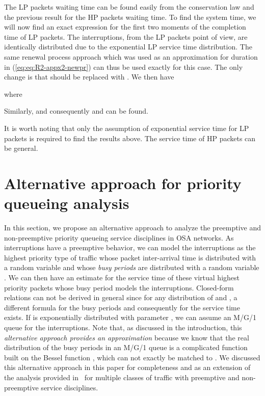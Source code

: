 \documentclass[11pt,journal,oneside,onecolumn,draftclsnofoot]{IEEEtran}
\begin{document}
The LP packets waiting time can be found easily from the conservation law and the previous result for the HP packets waiting time. To find the system time, we will now find an exact expression for the first two moments of the completion time of LP packets. The interruptions, from the LP packets point of view, are identically distributed due to the exponential LP service time distribution.
The same renewal process approach which was used as an approximation for  duration in (\ref{eq:eq:R2-appx2-newpr}) can thus be used exactly for this case. The only change is that  should be replaced with .
We then have 

where 

Similarly,  and consequently  and  can be found.

It is worth noting that only the assumption of exponential service time for LP packets is required to find the results above. The service time of HP packets can be general. 

\section{Alternative approach for priority queueing analysis}
\label{app:alt_approach}
In this section, we propose an alternative approach to analyze the preemptive and non-preemptive priority queueing service disciplines in OSA networks. As interruptions have a preemptive behavior, we can model the interruptions as the highest priority type of traffic whose packet inter-arrival time is distributed with a random variable  and whose \emph{busy periods} are distributed with a random variable . We can then have an estimate for the service time of these virtual highest priority packets whose  busy period models the interruptions. Closed-form relations can not be derived in general since for any distribution of  and , a different formula for the busy periods and consequently for the service time exists. If  is exponentially distributed with parameter , we can assume an  M/G/1 queue for the interruptions.  
Note that, as discussed in the introduction, this \emph{alternative approach provides an approximation} because we know that the real distribution of the busy periods in an M/G/1 queue is a complicated function built on the Bessel function \cite{takagi91}, which can not exactly be matched to . We discussed this alternative approach in this paper for completeness and as an extension of the analysis provided in~\cite{wang-l11,rashid07,laourine10} for multiple classes of traffic with preemptive and non-preemptive service disciplines.
\end{document}
